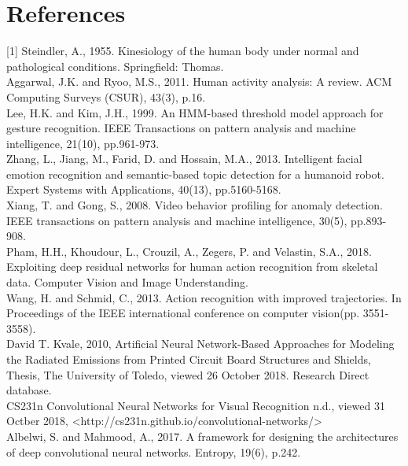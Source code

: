 \section{References}
[1] Steindler, A., 1955. Kinesiology of the human body under normal and pathological conditions. Springfield: Thomas.\\
\newline
[2] Aggarwal, J.K. and Ryoo, M.S., 2011. Human activity analysis: A review. ACM Computing Surveys (CSUR), 43(3), p.16.\\
[3] Lee, H.K. and Kim, J.H., 1999. An HMM-based threshold model approach for gesture recognition. IEEE Transactions on pattern analysis and machine intelligence, 21(10), pp.961-973.\\
\newline
[4] Zhang, L., Jiang, M., Farid, D. and Hossain, M.A., 2013. Intelligent facial emotion recognition and semantic-based topic detection for a humanoid robot. Expert Systems with Applications, 40(13), pp.5160-5168.\\
\newline
[5] Xiang, T. and Gong, S., 2008. Video behavior profiling for anomaly detection. IEEE transactions on pattern analysis and machine intelligence, 30(5), pp.893-908.\\
\newline
[6] Pham, H.H., Khoudour, L., Crouzil, A., Zegers, P. and Velastin, S.A., 2018. Exploiting deep residual networks for human action recognition from skeletal data. Computer Vision and Image Understanding.\\
\newline
[7] Wang, H. and Schmid, C., 2013. Action recognition with improved trajectories. In Proceedings of the IEEE international conference on computer vision(pp. 3551-3558).\\
\newline
[8] David T. Kvale, 2010, Artificial Neural Network-Based Approaches for Modeling the Radiated Emissions from Printed Circuit Board Structures and Shields, Thesis, The University of Toledo, viewed 26 October 2018. Research Direct database.\\
\newline
[9] CS231n Convolutional Neural Networks for Visual Recognition n.d., viewed 31 Octber 2018, <http://cs231n.github.io/convolutional-networks/>\\
\newline
[10] Albelwi, S. and Mahmood, A., 2017. A framework for designing the architectures of deep convolutional neural networks. Entropy, 19(6), p.242.\\
